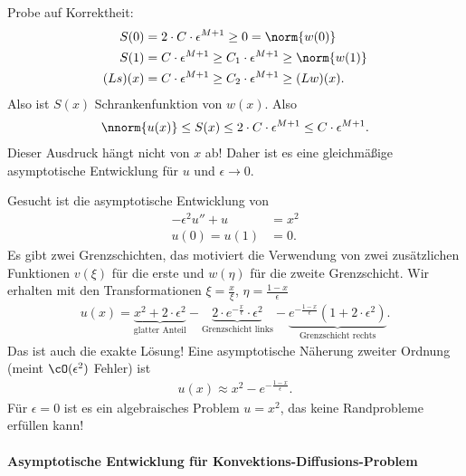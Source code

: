 Probe auf Korrektheit:
\begin{align*}
  S(0) &= 2\cdot C\cdot\epsilon^{M+1} \geq 0 = \norm{w(0)}\\
  S(1) &= C\cdot\epsilon^{M+1} \geq C_{1}\cdot \epsilon^{M+1} \geq \norm{w(1)}\\
(Ls)(x) & = C\cdot \epsilon^{M+1} \geq C_{2}\cdot \epsilon^{M+1} \geq (Lw)(x). 
\end{align*}
Also ist $S(x)$ Schrankenfunktion von $w(x)$. Also
\begin{align*}
  \nnorm{u(x)}\leq S(x) \leq 2\cdot C \cdot \epsilon^{M+1} \leq C\cdot \epsilon^{M+1}. 
\end{align*}
Dieser Ausdruck hängt nicht von $x$ ab! Daher ist es eine gleichmäßige asymptotische Entwicklung für $u$ und $\epsilon \to 0$. 

\begin{beispiel}\label{ex:4-4}
  Gesucht ist die asymptotische Entwicklung von
  \begin{align*}
    - \epsilon^{2}u'' + u &= x^{2}\\
u(0) = u(1) &= 0. 
  \end{align*}
Es gibt zwei Grenzschichten, das motiviert die Verwendung von zwei zusätzlichen Funktionen $v(\xi)$ für die erste und $w(\eta)$ für die zweite Grenzschicht. Wir erhalten mit den Transformationen $\xi = \frac x \xi$, $\eta = \frac {1 - x} \epsilon$
\begin{align*}
  u(x) = \underbrace{x^{2} + 2\cdot \epsilon^{2}}_{\text{glatter Anteil}} - \underbrace{2\cdot e^{- \frac x \epsilon}\cdot \epsilon^{2}}_{\text{Grenzschicht links}} - \underbrace{e^{- \frac {1-x} \epsilon}(1 + 2\cdot \epsilon^{2})}_{\text{Grenzschicht rechts}}. 
\end{align*}
Das ist auch die exakte Lösung! Eine asymptotische Näherung zweiter Ordnung (meint $\cO(\epsilon^{2})$ Fehler) ist
\begin{align*}
  u(x) \approx x^{2} - e^{- \frac {1-x} \epsilon}.
\end{align*}
Für $\epsilon = 0$ ist es ein algebraisches Problem $u = x^{2}$, das keine Randprobleme erfüllen kann!
\end{beispiel}

\paragraph{Asymptotische Entwicklung für Konvektions-Diffusions-Problem}
\label{sec:asympt-entw-fur-konv}

